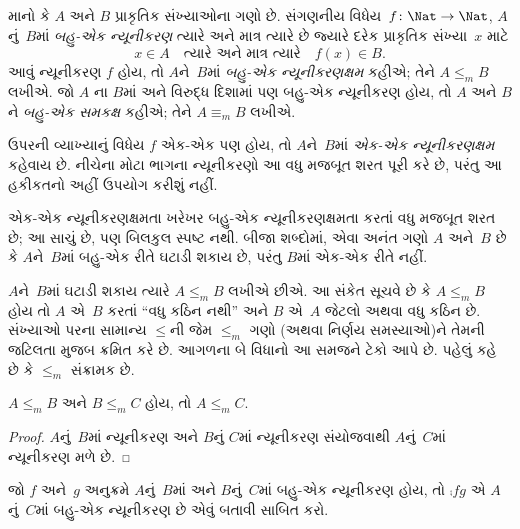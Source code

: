 \begin{defn}
માનો કે $A$ અને $B$ પ્રાકૃતિક સંખ્યાઓના ગણો છે.
સંગણનીય વિધેય~$f\colon \Nat \to \Nat$, $A$નું~$B$માં
\emph{બહુ-એક ન્યૂનીકરણ} ત્યારે અને માત્ર ત્યારે છે જ્યારે
દરેક પ્રાકૃતિક સંખ્યા~$x$ માટે
\[
x \in A \quad \text{ત્યારે અને માત્ર ત્યારે} \quad f(x) \in B.
\]
આવું ન્યૂનીકરણ $f$ હોય, તો $A$ને~$B$માં \emph{બહુ-એક
ન્યૂનીકરણક્ષમ} કહીએ; તેને $A \leq_m B$ લખીએ. જો $A$
ના $B$માં અને વિરુદ્ધ દિશામાં પણ બહુ-એક ન્યૂનીકરણ હોય,
તો $A$ અને $B$ને \emph{બહુ-એક સમકક્ષ} કહીએ; તેને
$A \equiv_m B$ લખીએ.
\end{defn}

ઉપરની વ્યાખ્યાનું વિધેય $f$ એક-એક પણ હોય, તો $A$ને~$B$માં
\emph{એક-એક ન્યૂનીકરણક્ષમ} કહેવાય છે. નીચેના મોટા ભાગના
ન્યૂનીકરણો આ વધુ મજબૂત શરત પૂરી કરે છે, પરંતુ આ હકીકતનો
અહીં ઉપયોગ કરીશું નહીં.

\begin{digress}
એક-એક ન્યૂનીકરણક્ષમતા ખરેખર બહુ-એક ન્યૂનીકરણક્ષમતા કરતાં
વધુ મજબૂત શરત છે; આ સાચું છે, પણ બિલકુલ સ્પષ્ટ નથી.
બીજા શબ્દોમાં, એવા અનંત ગણો $A$ અને~$B$ છે કે $A$ને~$B$માં
બહુ-એક રીતે ઘટાડી શકાય છે, પરંતુ $B$માં એક-એક રીતે નહીં.
\end{digress}
\endgroup


\begingroup
\makeatletter{}\makeatother

\label{guunit:OLP-0244}


$A$ને~$B$માં ઘટાડી શકાય ત્યારે $A \leq_m B$ લખીએ છીએ. આ
સંકેત સૂચવે છે કે $A \leq_m B$ હોય તો $A$ એ~$B$ કરતાં
``વધુ કઠિન નથી'' અને $B$ એ~$A$ જેટલો અથવા વધુ કઠિન છે.
સંખ્યાઓ પરના સામાન્ય $\le$ની જેમ $\le_m$ ગણો (અથવા
નિર્ણય સમસ્યાઓ)ને તેમની જટિલતા મુજબ ક્રમિત કરે છે.
આગળના બે વિધાનો આ સમજને ટેકો આપે છે. પહેલું કહે છે કે
$\le_m$ સંક્રામક છે.

\begin{prop}
$A \leq_m B$ અને $B \leq_m C$ હોય, તો $A \leq_m C$.
\end{prop}

\begin{proof}
$A$નું~$B$માં ન્યૂનીકરણ અને $B$નું $C$માં ન્યૂનીકરણ
સંયોજવાથી $A$નું~$C$માં ન્યૂનીકરણ મળે છે.
\end{proof}

\begin{prob}
જો $f$ અને~$g$ અનુક્રમે $A$નું~$B$માં અને $B$નું~$C$માં
બહુ-એક ન્યૂનીકરણ હોય, તો $\comp{f}{g}$ એ $A$નું~$C$માં
બહુ-એક ન્યૂનીકરણ છે એવું બતાવી 
સાબિત કરો.
\end{prob}

